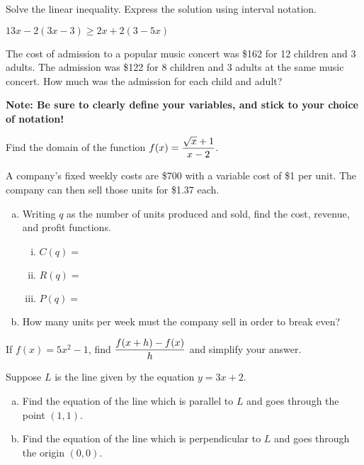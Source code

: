 \documentclass[11pt]{exam}
\begin{document}
\begin{questions}
\begin{enumerate}[(a)]
\end{enumerate}
\newpage

\question[4] Solve the linear inequality.  Express the solution using interval notation.
\begin{center}
$13x - 2(3x - 3)\geq 2x + 2(3 - 5x)$
\end{center}
\newpage

\question[4] The cost of admission to a popular music concert was \$162 for 12 children and 3 \nolinebreak adults.
The admission was \$122 for 8 children and 3 adults at the same music concert. How much was the admission for each child and adult?
 
\noindent\textbf{Note:  Be sure to clearly define your variables, and stick to your choice of notation!}
\vspace{10cm}

\question[3] Find the domain of the function $\displaystyle{f(x) = \frac{\sqrt{x} + 1}{x - 2}}$.
\newpage

\question[4] A company's fixed weekly costs are \$700 with a variable cost of \$1 per unit.  The company can then sell those units for \$1.37 each.  
\begin{enumerate}[(a)]
\item Writing $q$ as the number of units produced and sold, find the cost, revenue, and profit functions.
\vspace{1cm}

\begin{enumerate}[(i)]
\item $C(q) =$
\vspace{1cm}

\item $R(q) =$
\vspace{1cm}

\item $P(q) =$
\vspace{1cm}
\end{enumerate}

\item How many units per week must the company sell in order to break even?
\end{enumerate}
\vspace{3cm}

\question[4] If $f(x) = 5x^2 - 1$, find $\displaystyle{\frac{f(x +h) - f(x)}{h}}$ and simplify your answer.
\newpage

\question[3] Suppose $L$ is the line given by the equation $y = 3x + 2$.
\begin{enumerate}[(a)]
\item Find the equation of the line which is parallel to $L$ and goes through the point $(1, 1)$.
\vspace{6cm}

\item Find the equation of the line which is perpendicular to $L$ and goes through the origin $(0,0)$.
\end{enumerate} 
\end{questions}
\end{document}
